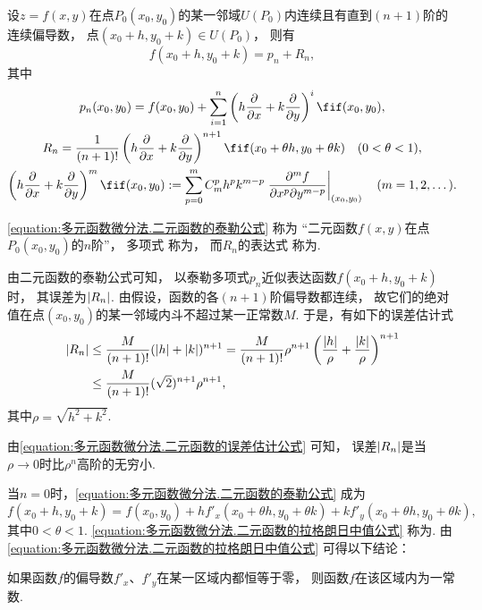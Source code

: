\begin{theorem}\label{theorem:多元函数微分法.二元函数的泰勒公式}
\def\oprt#1{%
	\left(h\pdv{x}+k\pdv{y}\right)%
	\ifx\relax#1\relax\else\ifnum1=0#1\relax\else^{#1}\fi\fi%
}
设\(z=f(x,y)\)在点\(P_0(x_0,y_0)\)的某一邻域\(U(P_0)\)内连续且有直到\((n+1)\)阶的连续偏导数，
点\((x_0+h,y_0+k) \in U(P_0)\)，
则有\begin{equation}\label{equation:多元函数微分法.二元函数的泰勒公式}
	f(x_0+h,y_0+k) = p_n + R_n,
\end{equation}
其中\begin{gather}
	p_n(x_0,y_0)
	=f(x_0,y_0)
	+ \sum_{i=1}^n \oprt{i} f(x_0,y_0),
	\label{equation:多元函数微分法.二元函数的泰勒多项式} \\
	R_n = \frac{1}{(n+1)!} \oprt{n+1} f(x_0+\theta h,y_0+\theta k)
	\quad (0 < \theta < 1),
	\label{equation:多元函数微分法.二元函数的泰勒公式的拉格朗日余项} \\
	\oprt{m} f(x_0,y_0)
	\defeq
	\sum_{p=0}^{m} C_m^p h^p k^{m-p}
		\eval{
			\frac{\partial^m f}{\partial x^p \partial y^{m-p}}
		}_{(x_0,y_0)}
	\quad(m=1,2,\dotsc).
\end{gather}

\rm
\cref{equation:多元函数微分法.二元函数的泰勒公式} 称为
“二元函数\(f(x,y)\)在点\(P_0(x_0,y_0)\)的\(n\)阶”，
多项式  称为，
而\(R_n\)的表达式 
称为.
\end{theorem}
由二元函数的泰勒公式可知，
以泰勒多项式\(p_n\)近似表达函数\(f(x_0+h,y_0+k)\)时，
其误差为\(\abs{R_n}\).
由假设，函数的各\((n+1)\)阶偏导数都连续，
故它们的绝对值在点\((x_0,y_0)\)的某一邻域内斗不超过某一正常数\(M\).
于是，有如下的误差估计式\begin{align}
	\abs{R_n}
	&\leq \frac{M}{(n+1)!} (\abs{h}+\abs{k})^{n+1}
	= \frac{M}{(n+1)!} \rho^{n+1}
		\left( \frac{\abs{h}}{\rho} + \frac{\abs{k}}{\rho} \right)^{n+1}
		\notag \\
	&\leq \frac{M}{(n+1)!} (\sqrt{2})^{n+1} \rho^{n+1},
	\label{equation:多元函数微分法.二元函数的误差估计公式}
\end{align}
其中\(\rho=\sqrt{h^2+k^2}\).

由\cref{equation:多元函数微分法.二元函数的误差估计公式} 可知，
误差\(\abs{R_n}\)是当\(\rho\to0\)时比\(\rho^n\)高阶的无穷小.

当\(n=0\)时，\cref{equation:多元函数微分法.二元函数的泰勒公式} 成为
\begin{equation}\label{equation:多元函数微分法.二元函数的拉格朗日中值公式}
	f(x_0+h,y_0+k)
	= f(x_0,y_0)
	+ h f'_x(x_0+\theta h,y_0+\theta k)
	+ k f'_y(x_0+\theta h,y_0+\theta k),
\end{equation}
其中\(0<\theta<1\).
\cref{equation:多元函数微分法.二元函数的拉格朗日中值公式}
称为.
由\cref{equation:多元函数微分法.二元函数的拉格朗日中值公式}
可得以下结论：
\begin{proposition}
如果函数\(f\)的偏导数\(f'_x\)、\(f'_y\)在某一区域内都恒等于零，
则函数\(f\)在该区域内为一常数.
\end{proposition}

